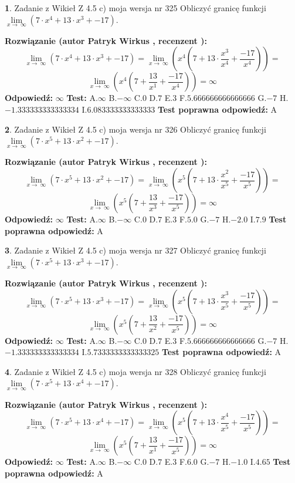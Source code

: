 \documentclass[12pt, a4paper]{article}
\theoremstyle{definition} %
\newtheorem{zad}{}
\newcommand{\zadStart}[1]{\begin{zad}#1\newline}
\newcommand{\zadStop}{\end{zad}}
\newcommand{\rozwStart}[2]{\noindent \textbf{Rozwiązanie (autor #1 , recenzent #2): }\newline}
\newcommand{\rozwStop}{\newline}
\newcommand{\odpStart}{\noindent \textbf{Odpowiedź:}\newline}
\newcommand{\odpStop}{\newline}
\newcommand{\testStart}{\noindent \textbf{Test:}\newline}
\newcommand{\testStop}{\newline}
\newcommand{\kluczStart}{\noindent \textbf{Test poprawna odpowiedź:}\newline}
\newcommand{\kluczStop}{\newline}
\begin{document}
\zadStart{Zadanie z Wikieł Z 4.5 c) moja wersja nr 325}
Obliczyć granicę funkcji  $\lim\limits_{x\to\ \infty}(7 \cdot x^{4}+13 \cdot x^{3}+-17)$.
\zadStop
\rozwStart{Patryk Wirkus}{}
$$\lim\limits_{x\to\ \infty}(7 \cdot x^{4}+13 \cdot x^{3}+-17) = \lim\limits_{x\to\ \infty}(x^{4}(7 +13 \cdot \frac{x^{3}}{x^{4}}+\frac{-17}{x^{4}})) =$$ $$\lim\limits_{x\to\ \infty}(x^{4}(7 +\frac{13}{x^{1}}+\frac{-17}{x^{4}})) =\infty$$
\rozwStop
\odpStart
$\infty$
\odpStop
\testStart
A.$\infty$ B.$-\infty$ C.$0$ D.$7$ E.$3$
F.$5.666666666666666$ G.$-7$
H.$-1.333333333333334$
I.$6.083333333333333$
\testStop
\kluczStart
A
\kluczStop



\zadStart{Zadanie z Wikieł Z 4.5 c) moja wersja nr 326}
Obliczyć granicę funkcji  $\lim\limits_{x\to\ \infty}(7 \cdot x^{5}+13 \cdot x^{2}+-17)$.
\zadStop
\rozwStart{Patryk Wirkus}{}
$$\lim\limits_{x\to\ \infty}(7 \cdot x^{5}+13 \cdot x^{2}+-17) = \lim\limits_{x\to\ \infty}(x^{5}(7 +13 \cdot \frac{x^{2}}{x^{5}}+\frac{-17}{x^{5}})) =$$ $$\lim\limits_{x\to\ \infty}(x^{5}(7 +\frac{13}{x^{3}}+\frac{-17}{x^{5}})) =\infty$$
\rozwStop
\odpStart
$\infty$
\odpStop
\testStart
A.$\infty$ B.$-\infty$ C.$0$ D.$7$ E.$3$
F.$5.0$ G.$-7$
H.$-2.0$
I.$7.9$
\testStop
\kluczStart
A
\kluczStop



\zadStart{Zadanie z Wikieł Z 4.5 c) moja wersja nr 327}
Obliczyć granicę funkcji  $\lim\limits_{x\to\ \infty}(7 \cdot x^{5}+13 \cdot x^{3}+-17)$.
\zadStop
\rozwStart{Patryk Wirkus}{}
$$\lim\limits_{x\to\ \infty}(7 \cdot x^{5}+13 \cdot x^{3}+-17) = \lim\limits_{x\to\ \infty}(x^{5}(7 +13 \cdot \frac{x^{3}}{x^{5}}+\frac{-17}{x^{5}})) =$$ $$\lim\limits_{x\to\ \infty}(x^{5}(7 +\frac{13}{x^{2}}+\frac{-17}{x^{5}})) =\infty$$
\rozwStop
\odpStart
$\infty$
\odpStop
\testStart
A.$\infty$ B.$-\infty$ C.$0$ D.$7$ E.$3$
F.$5.666666666666666$ G.$-7$
H.$-1.333333333333334$
I.$5.7333333333333325$
\testStop
\kluczStart
A
\kluczStop



\zadStart{Zadanie z Wikieł Z 4.5 c) moja wersja nr 328}
Obliczyć granicę funkcji  $\lim\limits_{x\to\ \infty}(7 \cdot x^{5}+13 \cdot x^{4}+-17)$.
\zadStop
\rozwStart{Patryk Wirkus}{}
$$\lim\limits_{x\to\ \infty}(7 \cdot x^{5}+13 \cdot x^{4}+-17) = \lim\limits_{x\to\ \infty}(x^{5}(7 +13 \cdot \frac{x^{4}}{x^{5}}+\frac{-17}{x^{5}})) =$$ $$\lim\limits_{x\to\ \infty}(x^{5}(7 +\frac{13}{x^{1}}+\frac{-17}{x^{5}})) =\infty$$
\rozwStop
\odpStart
$\infty$
\odpStop
\testStart
A.$\infty$ B.$-\infty$ C.$0$ D.$7$ E.$3$
F.$6.0$ G.$-7$
H.$-1.0$
I.$4.65$
\testStop
\kluczStart
A
\kluczStop
\end{document}
